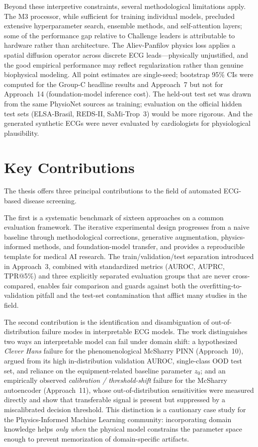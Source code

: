 Beyond these interpretive constraints, several methodological limitations apply. The M3 processor, while sufficient for training individual models, precluded extensive hyperparameter search, ensemble methods, and self-attention layers; some of the performance gap relative to Challenge leaders is attributable to hardware rather than architecture. The Aliev-Panfilov physics loss applies a spatial diffusion operator across discrete ECG leads---physically unjustified, and the good empirical performance may reflect regularization rather than genuine biophysical modeling. All point estimates are single-seed; bootstrap 95\% CIs were computed for the Group-C headline results and Approach~7 but not for Approach~14 (foundation-model inference cost). The held-out test set was drawn from the same PhysioNet sources as training; evaluation on the official hidden test sets (ELSA-Brasil, REDS-II, SaMi-Trop~3) would be more rigorous. And the generated synthetic ECGs were never evaluated by cardiologists for physiological plausibility.

\section{Key Contributions}

The thesis offers three principal contributions to the field of automated ECG-based disease screening.

The first is a systematic benchmark of sixteen approaches on a common evaluation framework. The iterative experimental design progresses from a naive baseline through methodological corrections, generative augmentation, physics-informed methods, and foundation-model transfer, and provides a reproducible template for medical AI research. The train/validation/test separation introduced in Approach~3, combined with standardized metrics (AUROC, AUPRC, TPR@5\%) and three explicitly separated evaluation groups that are never cross-compared, enables fair comparison and guards against both the overfitting-to-validation pitfall and the test-set contamination that afflict many studies in the field.

The second contribution is the identification and disambiguation of out-of-distribution failure modes in interpretable ECG models. The work distinguishes two ways an interpretable model can fail under domain shift: a hypothesized \textit{Clever Hans} failure for the phenomenological McSharry PINN (Approach~10), argued from its high in-distribution validation AUROC, single-class OOD test set, and reliance on the equipment-related baseline parameter $z_0$; and an empirically observed \textit{calibration / threshold-shift} failure for the McSharry autoencoder (Approach~11), whose out-of-distribution sensitivities were measured directly and show that transferable signal is present but suppressed by a miscalibrated decision threshold. This distinction is a cautionary case study for the Physics-Informed Machine Learning community: incorporating domain knowledge helps \textit{only when} the physical model constrains the parameter space enough to prevent memorization of domain-specific artifacts.

